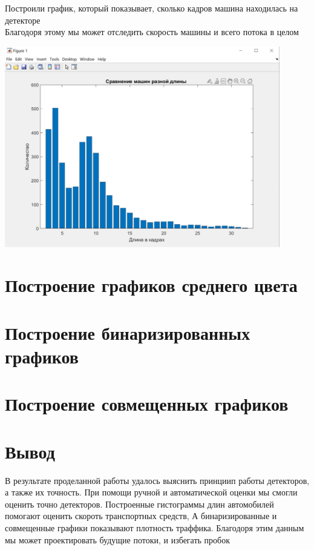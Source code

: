 \documentclass[a4paper,12pt]{article}
\begin{document}
Построили график, который показывает, сколько кадров машина находилась на детекторе\\
Благодоря этому мы может отследить скорость машины и всего потока в целом
\begin{center}
\includegraphics[width=0.9\textwidth]{histogram.jpg}
\end{center}


\section*{Построение графиков среднего цвета}
\newpage
\section*{Построение бинаризированных графиков}
\newpage
\section*{Построение совмещенных графиков}
\newpage
\section*{Вывод}
В результате проделанной работы удалось выяснить принциип работы детекторов, а также их точность.
При помощи ручной и автоматической оценки мы смогли оценить точно детекторов.
Построенные гистограммы длин автомобилей помогают оценить скороть транспортных средств,
А бинаризированные и совмещенные графики показывают плотность траффика.
Благодоря этим данным мы может проектировать будущие потоки, и избегать пробок
\newpage
\end{document}
